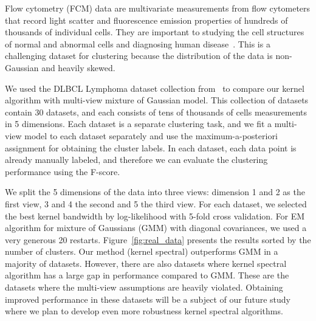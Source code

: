 
Flow cytometry (FCM) data are multivariate measurements from flow cytometers that record light scatter and fluorescence emission properties of hundreds of thousands of individual cells. They are important to studying the cell structures of normal and abnormal cells and diagnosing human disease~\cite{cytometry_nature}. This is a challenging dataset for clustering because the distribution of the data is non-Gaussian and heavily skewed.

We used the DLBCL Lymphoma dataset collection from~\cite{cytometry_nature} to compare our kernel algorithm with multi-view mixture of Gaussian model.
This collection of datasets contain 30 datasets, and each consists of tens of thousands of cells measurements in 5 dimensions. Each dataset is a separate clustering task, and we fit a multi-view model to each dataset separately and use the maximum-a-posteriori assignment for obtaining the cluster labels.  In each dataset, each data point is already manually labeled, and therefore we can evaluate the clustering performance using the F-score.

We split the 5 dimensions of the data into three views: dimension 1 and 2 as the first view, 3 and 4 the second and 5 the third view. For each dataset, we selected the best kernel bandwidth by log-likelihood with 5-fold cross validation. For EM algorithm for mixture of Gaussians (GMM) with diagonal covariances, we used a very generous 20 restarts. Figure~\ref{fig:real_data} presents the results sorted by the number of clusters. Our method (kernel spectral) outperforms GMM in a majority of datasets. However, there are also datasets where kernel spectral algorithm has a large gap in performance compared to GMM. These are the datasets where the multi-view assumptions are heavily violated. Obtaining improved performance in these datasets will be a subject of our future study where we plan to develop even more robustness kernel spectral algorithms.

